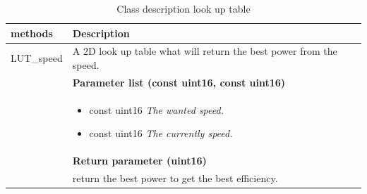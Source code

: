 \begin{table}[H]
	\centering
	\begin{tabular}{|p{5 cm}|p{10 cm}|}
		\hline
		\textbf{methods} & \textbf{Description} \\ \hline
		
		LUT\_speed
		& A 2D look up table what will return the best power from the speed.
		\\ & \textbf{Parameter list (const uint16, const uint16)}
		\\ & \begin{itemize}
			\item {\large const uint16}
			\subitem \textit{The wanted speed.}
			\item {\large const uint16}
			\subitem \textit{The currently speed.}
		\end{itemize}
		\\ & \textbf{Return parameter (uint16)}
		\\ & return the best power to get the best efficiency.
		\\ \hline
		
	\end{tabular}
	\caption{Class description look up table}
	\label{table:Class_description_MCU_LUT}
\end{table}

